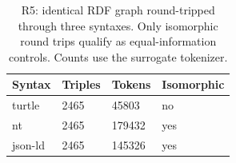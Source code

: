 \begin{table}[t]
\centering\footnotesize
\caption{R5: identical RDF graph round-tripped through three syntaxes. Only isomorphic round trips qualify as equal-information controls. Counts use the surrogate tokenizer.}
\label{tab:revision-serialisation}
\begin{tabular}{@{}llll@{}}
\toprule
Syntax & Triples & Tokens & Isomorphic \\
\midrule
turtle & 2465 & 45803 & no \\
nt & 2465 & 179432 & yes \\
json-ld & 2465 & 145326 & yes \\
\bottomrule
\end{tabular}
\end{table}
